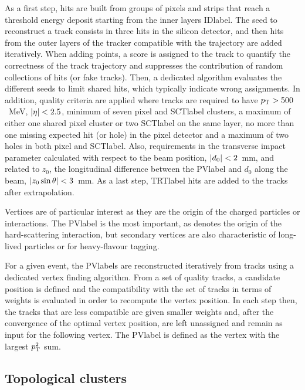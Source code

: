 As a first step, hits are built from groups of pixels and strips that reach a threshold energy deposit starting from the inner layers \acrshort{IDlabel}. The seed to reconstruct a track consists in three hits in the silicon detector, and then hits from the outer layers of the tracker compatible with the trajectory are added iteratively. When adding points, a score is assigned to the track to quantify the correctness of the track trajectory and suppresses the contribution of random collections of hits (or fake tracks). Then, a dedicated algorithm evaluates the different seeds to limit shared hits, which typically indicate wrong assignments. In addition, quality criteria are applied where tracks are required to have $p_{\text{T}}>500$~MeV, $\abs{\eta}<2.5$, minimum of seven pixel and \acrshort{SCTlabel} clusters, a maximum of either one shared pixel cluster or two \acrshort{SCTlabel} on the same layer, no more than one missing expected hit (or hole) in the pixel detector and a maximum of two holes in both pixel and \acrshort{SCTlabel}. Also, requirements in the transverse impact parameter calculated with respect to the beam position, $\abs{d_0}<2$~mm, and related to $z_0$, the longitudinal difference between the \acrshort{PVlabel} and $d_0$ along the beam, $\abs{z_0 \sin\theta} <3$~mm. As a last step, \acrshort{TRTlabel} hits are added to the tracks after extrapolation.

Vertices are of particular interest as they are the origin of the charged particles or interactions. The \acrshort{PVlabel} is the most important, as denotes the origin of the hard-scattering interaction, but secondary vertices are also characteristic of long-lived particles or for heavy-flavour tagging.

For a given event, the \acrshort{PVlabel}s are reconstructed iteratively from tracks using a dedicated vertex finding algorithm. From a set of quality tracks, a candidate position is defined and the compatibility with the set of tracks in terms of weights is evaluated in order to recompute the vertex position. In each step then, the tracks that are less compatible are given smaller weights and, after the convergence of the optimal vertex position, are left unassigned and remain as input for the following vertex. The \acrshort{PVlabel} is defined as the vertex with the largest $p_{\text{T}}^2$ sum. 

\subsection{Topological clusters}

